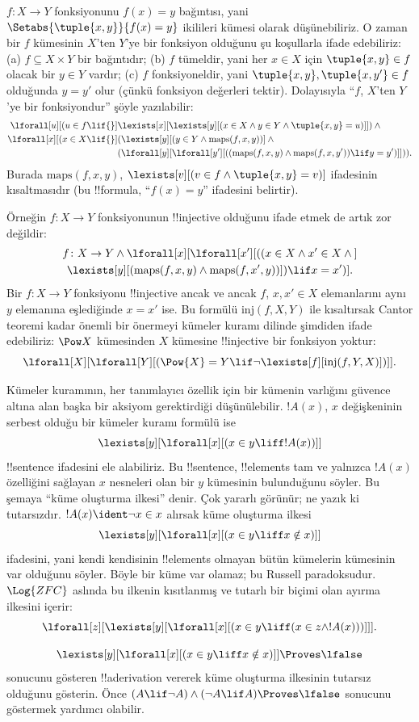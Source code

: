 $f\colon X\to Y$ fonksiyonunu $f(x)=y$ bağıntısı, yani
$\Setabs{\tuple{x,y}}{f(x)=y}$ ikilileri kümesi olarak düşünebiliriz.
O zaman bir $f$ kümesinin $X$'ten $Y$'ye bir fonksiyon olduğunu şu
koşullarla ifade edebiliriz: (a) $f\subseteq X\times Y$ bir bağıntıdır;
(b) $f$ tümeldir, yani her $x\in X$ için $\tuple{x,y}\in f$ olacak bir
$y\in Y$ vardır; (c) $f$ fonksiyoneldir, yani $\tuple{x,y},
\tuple{x,y'}\in f$ olduğunda $y=y'$ olur (çünkü fonksiyon değerleri
tektir). Dolayısıyla ``$f$, $X$'ten $Y$'ye bir fonksiyondur'' şöyle
yazılabilir:
\begin{align*}
 \lforall[u][(u \in f \lif {}] & \lexists[x][\lexists[y][(x \in X \land y \in
      Y \land \tuple{x, y} = u)]]) \land {}\\
 \lforall[x][(x \in X \lif {}] &
      (\lexists[y][(y \in Y \land \mathrm{maps}(f, x, y))] \land {}\\
& (\lforall[y][\lforall[y'][((\mathrm{maps}(f, x, y) \land
    \mathrm{maps}(f, x, y')) \lif y = y')]])).
\end{align*}
Burada $\mathrm{maps}(f,x,y)$, $\lexists[v][(v\in f\land
\tuple{x,y}=v)]$ ifadesinin kısaltmasıdır (bu !!{formula},
``$f(x)=y$'' ifadesini belirtir).

Örneğin $f\colon X\to Y$ fonksiyonunun !!{injective} olduğunu ifade
etmek de artık zor değildir:
\begin{multline*}
 f \colon X \to Y \land \lforall[x][\lforall[x'][((x \in X \land x' \in
     X \land {}] \\
 \lexists[y][(\mathrm{maps}(f, x, y) \land \mathrm{maps}(f,
        x', y))]) \lif x = x')].
\end{multline*}
Bir $f\colon X\to Y$ fonksiyonu !!{injective} ancak ve ancak $f$,
$x,x'\in X$ elemanlarını aynı $y$ elemanına eşlediğinde $x=x'$ ise.
Bu formülü $\mathrm{inj}(f,X,Y)$ ile kısaltırsak Cantor teoremi kadar
önemli bir önermeyi kümeler kuramı dilinde şimdiden ifade edebiliriz:
$\Pow X$ kümesinden $X$ kümesine !!{injective} bir fonksiyon yoktur:
\[
\lforall[X][\lforall[Y][(\Pow{X} = Y \lif
    \lnot\lexists[f][\mathrm{inj}(f, Y, X)])]].
\]

Kümeler kuramının, her tanımlayıcı özellik için bir kümenin varlığını
güvence altına alan başka bir aksiyom gerektirdiği düşünülebilir.
$!A(x)$, $x$ değişkeninin serbest olduğu bir kümeler kuramı formülü ise
\[
\lexists[y][\lforall[x][(x \in y \liff !A(x))]]
\]
!!{sentence} ifadesini ele alabiliriz. Bu !!{sentence}, !!{element}s
tam ve yalnızca $!A(x)$ özelliğini sağlayan $x$ nesneleri olan bir $y$
kümesinin bulunduğunu söyler. Bu şemaya ``küme oluşturma ilkesi''
denir. Çok yararlı görünür; ne yazık ki tutarsızdır. $!A(x)\ident
\lnot x\in x$ alırsak küme oluşturma ilkesi
\[
\lexists[y][\lforall[x][(x \in y \liff x \notin x)]]
\]
ifadesini, yani kendi kendisinin !!{element}s olmayan bütün kümelerin
kümesinin var olduğunu söyler. Böyle bir küme var olamaz; bu Russell
paradoksudur. $\Log{ZFC}$ aslında bu ilkenin kısıtlanmış ve tutarlı bir
biçimi olan ayırma ilkesini içerir:
\[
\lforall[z][\lexists[y][\lforall[x][(x \in y \liff (x \in z \land
      !A(x)))]]].
\]

\begin{prob}
\[
\lexists[y][\lforall[x][(x \in y \liff x \notin x)]] \Proves \lfalse
\]
sonucunu gösteren !!a{derivation} vererek küme oluşturma ilkesinin
tutarsız olduğunu gösterin. Önce
$(A\lif\lnot A)\land(\lnot A\lif A)\Proves\lfalse$ sonucunu göstermek
yardımcı olabilir.
\end{prob}
